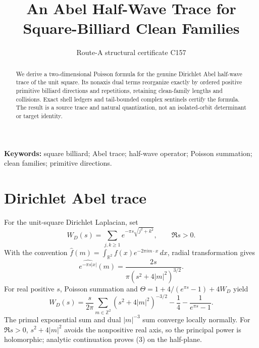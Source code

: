 \documentclass[10pt]{article}
\title{\vspace{-1.6em}An Abel Half-Wave Trace for Square-Billiard Clean Families}
\author{Route-A structural certificate C157}
\date{}
\begin{document}
\maketitle
\begin{abstract}
We derive a two-dimensional Poisson formula for the genuine Dirichlet Abel
half-wave trace of the unit square.  Its nonaxis dual terms reorganize exactly
by ordered positive primitive billiard directions and repetitions, retaining
clean-family lengths and collisions.  Exact shell ledgers and tail-bounded
complex sentinels certify the formula.  The result is a source trace and
natural quantization, not an isolated-orbit determinant or target identity.
\end{abstract}
\noindent\textbf{Keywords:} square billiard; Abel trace; half-wave operator;
Poisson summation; clean families; primitive directions.

\medskip
{}

\section{Dirichlet Abel trace}
For the unit-square Dirichlet Laplacian, set
\[
W_D(s)=\sum_{j,k\ge1}e^{-\pi s\sqrt{j^2+k^2}},\qquad \Re s>0.     \tag{1}
\]
With the convention
$\widehat f(m)=\int_{\mathbb R^2}f(x)e^{-2\pi i m\cdot x}\,dx$,
radial transformation gives
\[
\widehat{e^{-\pi s|x|}}(m)
=\frac{2s}{\pi(s^2+4|m|^2)^{3/2}}.                              \tag{2}
\]
For real positive $s$, Poisson summation and
$\Theta=1+4/(e^{\pi s}-1)+4W_D$ yield
\begin{equation}
W_D(s)=\frac{s}{2\pi}\sum_{m\in\mathbb Z^2}
(s^2+4|m|^2)^{-3/2}-\frac14-\frac1{e^{\pi s}-1}.                \tag{3}
\end{equation}
The primal exponential sum and dual $|m|^{-3}$ sum converge locally normally.
For $\Re s>0$, $s^2+4|m|^2$ avoids the nonpositive real axis, so the principal
power is holomorphic; analytic continuation proves (3) on the half-plane.
\end{document}
